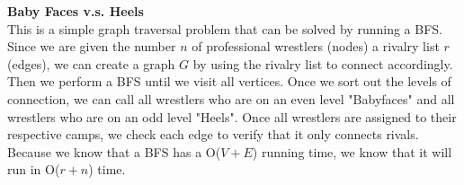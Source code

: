 \documentclass[11pt]{article}
\begin{document}
\begin{solution} \textbf{Baby Faces v.s. Heels}\\

	This is a simple graph traversal problem that can be solved by running a BFS. Since we are given the number $n$ of professional wrestlers (nodes) a rivalry list $r$ (edges), we can create a graph $G$ by using the rivalry list to connect accordingly. Then we perform a BFS until we visit all vertices. Once we sort out the levels of connection, we can call all wrestlers who are on an even level "Babyfaces" and all wrestlers who are on an odd level "Heels". Once all wrestlers are assigned to their respective camps, we check each edge to verify that it only connects rivals. Because we know that a BFS has a O($V + E$) running time, we know that it will run in O($r + n$) time. 
	
	
	\hfil
	

	
\end{solution}
\end{document}
